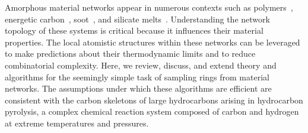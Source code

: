 \documentclass[fleqn,11pt]{article}
\begin{document}
Amorphous material networks appear in numerous contexts such as polymers~\cite{torres-knoopModeling2018}, energetic carbon~\cite{dernovMapping2025,deringerMachine2017}, soot~\cite{villa-alemanRaman2022}, and silicate melts~\cite{clarkShockramp2023}. 
Understanding the network topology of these systems is critical because it influences their material properties.
The local atomistic structures within these networks can be leveraged to make predictions about their thermodynamic limits and to reduce combinatorial complexity.
Here, we review, discuss, and extend theory and algorithms for the seemingly simple task of sampling rings from material networks. 
The assumptions under which these algorithms are efficient are consistent with the carbon skeletons of large hydrocarbons arising in hydrocarbon pyrolysis, 
a complex chemical reaction system composed of carbon and hydrogen at extreme temperatures and pressures.
\end{document}
